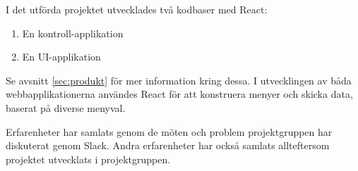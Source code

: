 I det utförda projektet utvecklades två kodbaser med React:

\begin{enumerate}
    \item En kontroll-applikation
    \item En UI-applikation
\end{enumerate} 

Se avsnitt \ref{sec:produkt} för mer information kring dessa. I utvecklingen av båda webbapplikationerna användes React för att konstruera menyer och skicka data, baserat på diverse menyval.

Erfarenheter har samlats genom de möten och problem projektgruppen har diskuterat genom Slack. Andra erfarenheter har också samlats allteftersom projektet utvecklats i projektgruppen.




